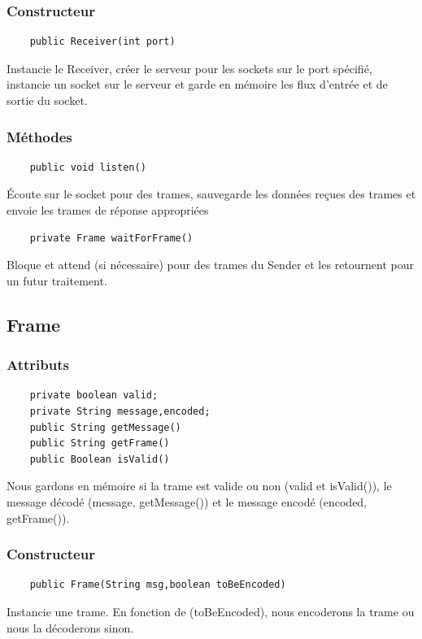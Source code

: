 \documentclass[a4paper,12pt]{article}
\begin{document}
\begin{spacing}{1}
	\subsubsection*{Constructeur}
	\begin{lstlisting}
	public Receiver(int port)
	\end{lstlisting}
	Instancie le Receiver, créer le serveur pour les sockets sur le port spécifié, instancie un socket sur le serveur et garde en mémoire les flux d'entrée et de sortie du socket.
	\subsubsection*{Méthodes}
	\begin{lstlisting}
	public void listen()
	\end{lstlisting}
	Écoute sur le socket pour des trames, sauvegarde les données reçues des trames et envoie les trames de réponse appropriées
	\begin{lstlisting}
	private Frame waitForFrame()
	\end{lstlisting}
	Bloque et attend (si nécessaire) pour des trames du Sender et les retournent pour un futur traitement.
	\subsection*{Frame}
	\subsubsection*{Attributs}
	\begin{lstlisting}
	private boolean valid;
	private String message,encoded;	
	public String getMessage()
	public String getFrame() 
	public Boolean isValid()
	\end{lstlisting}
	Nous gardons en mémoire si la trame est valide ou non (valid et isValid()), le message décodé (message, getMessage()) et le message encodé (encoded, getFrame()).
	\subsubsection*{Constructeur}
	\begin{lstlisting}
	public Frame(String msg,boolean toBeEncoded)
	\end{lstlisting}
	Instancie une trame. En fonction de (toBeEncoded), nous encoderons la trame ou nous la décoderons sinon.

\end{spacing}
\end{document}
